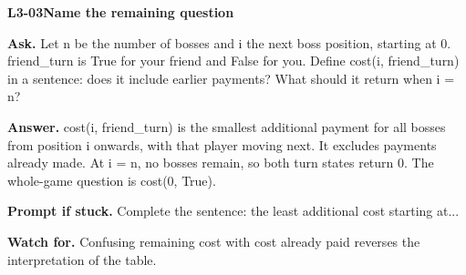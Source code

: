 \documentclass[11pt,a4paper]{article}
\begin{document}
\noindent\begin{minipage}{\textwidth}
{\color{teal}\textbf{L3-03}}\quad \textbf{Name the remaining question}\par\smallskip
\textbf{Ask.} Let n be the number of bosses and i the next boss position, starting at 0. friend\_turn is True for your friend and False for you. Define cost(i, friend\_turn) in a sentence: does it include earlier payments? What should it return when i = n?\par\smallskip
\textbf{Answer.} cost(i, friend\_turn) is the smallest additional payment for all bosses from position i onwards, with that player moving next. It excludes payments already made. At i = n, no bosses remain, so both turn states return 0. The whole-game question is cost(0, True).\par\smallskip
\textbf{Prompt if stuck.} Complete the sentence: the least additional cost starting at...\par\smallskip
\textbf{Watch for.} Confusing remaining cost with cost already paid reverses the interpretation of the table.
\end{minipage}\par{}\medskip
\end{document}
